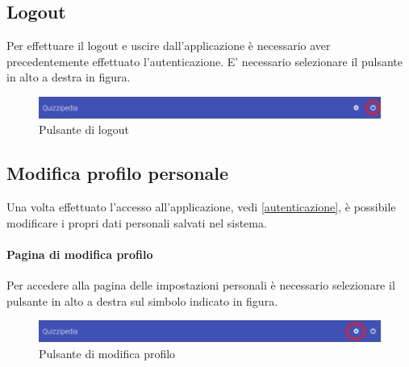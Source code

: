 \documentclass[12pt,a4paper]{article}
\begin{document}
		
	\subsection{Logout}
	Per effettuare il logout e uscire dall'applicazione è necessario aver precedentemente effettuato l'autenticazione.
	E' necessario selezionare il pulsante in alto a destra in figura.
	\begin{figure}[h]	
		\centering
		\includegraphics[width=1.0\linewidth]{../img/screenshot/barraLogout.png}
		\caption{Pulsante di logout}
		\label{Pulsante di logout}
	\end{figure}

	\subsection{Modifica profilo personale}
	Una volta effettuato l'accesso all'applicazione, vedi \ref{autenticazione}, è possibile modificare i propri dati personali salvati nel sistema.
    
	\paragraph{Pagina di modifica profilo}
	Per accedere alla pagina delle impostazioni personali è necessario selezionare il pulsante in alto a destra sul simbolo indicato in figura.
	
	\begin{figure}[h]
		\centering
		\includegraphics[width=1.0\linewidth]{../img/screenshot/barraImpostaz.png}
		\caption{Pulsante di modifica profilo}
		\label{Pulsante di modifica profilo}
	\end{figure}
	
\end{document}

